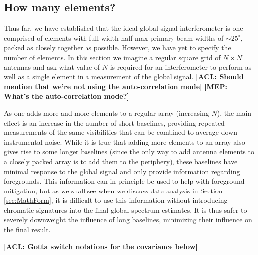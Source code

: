 \documentclass[twolcolumn,apj,iop,numberedappendix]{emulateapj}
\newcommand{\acl}[1]{{\color{red} \textbf{[ACL:  #1]}}}
\newcommand{\mep}[1]{{\color{applegreen} \textbf{[MEP:  #1]}}}
\begin{document}
\subsection{How many elements?}
\label{sec:numElems}
Thus far, we have established that the ideal global signal interferometer is one comprised of elements with full-width-half-max primary beam widths of $\sim25^\circ$, packed as closely together as possible. However, we have yet to specify the number of elements. In this section we imagine a regular square grid of $N \times N$ antennas and ask what value of $N$ is required for an interferometer to perform as well as a single element in a measurement of the global signal.\acl{Should mention that we're not using the auto-correlation mode} \mep{What's the auto-correlation mode?}

As one adds more and more elements to a regular array (increasing $N$), the main effect is an increase in the number of short baselines, providing repeated measurements of the same visibilities that can be combined to average down instrumental noise. While it is true that adding more elements to an array also gives rise to some longer baselines (since the only way to add antenna elements to a closely packed array is to add them to the periphery), these baselines have minimal response to the global signal and only provide information regarding foregrounds. This information can in principle be used to help with foreground mitigation, but as we shall see when we discuss data analysis in Section \ref{sec:MathForm}, it is difficult to use this information without introducing chromatic signatures into the final global spectrum estimates. It is thus safer to severely downweight the influence of long baselines, minimizing their influence on the final result.

\acl{Gotta switch notations for the covariance below}
\end{document}
